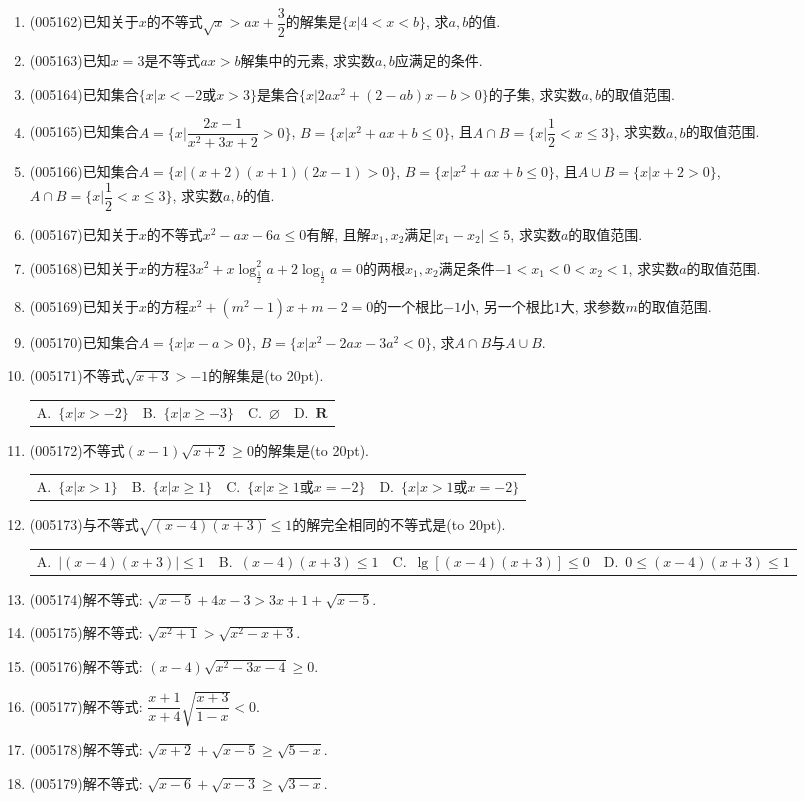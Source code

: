 \documentclass[10pt,a4paper]{article}
\newcommand{\bracket}[1]{(\hbox to #1pt{})}
\newcommand{\fourch}[4]{\par\begin{tabular}{p{.23\textwidth}p{.23\textwidth}p{.23\textwidth}p{.23\textwidth}}
A.~#1 &B.~#2& C.~#3& D.~#4
\end{tabular}}
\begin{document}
\begin{enumerate}[1.]
\item {\tiny (005162)}已知关于$x$的不等式$\sqrt x>ax+\dfrac 32$的解集是$\{x|4<x<b\}$, 求$a,b$的值.
\item {\tiny (005163)}已知$x=3$是不等式$ax>b$解集中的元素, 求实数$a,b$应满足的条件.
\item {\tiny (005164)}已知集合$\{x|x<-2\text{或}x>3\}$是集合$\{x|2ax^2+(2-ab)x-b>0\}$的子集, 求实数$a,b$的取值范围.
\item {\tiny (005165)}已知集合$A=\{x|\dfrac{2x-1}{x^2+3x+2}>0\}$, $B=\{x|x^2+ax+b\le 0\}$, 且$A\cap B=\{x|\dfrac 12<x\le 3\}$, 求实数$a,b$的取值范围.
\item {\tiny (005166)}已知集合$A=\{x|(x+2)(x+1)(2x-1)>0\}$, $B=\{x|x^2+ax+b\le 0\}$, 且$A\cup B=\{x|x+2 >0\}$, $A\cap B=\{x|\dfrac 12<x\le 3\}$, 求实数$a,b$的值.
\item {\tiny (005167)}已知关于$x$的不等式$x^2-ax-6a\le 0$有解, 且解$x_1,x_2$满足$|x_1-x_2|\le 5$, 求实数$a$的取值范围.
\item {\tiny (005168)}已知关于$x$的方程$3x^2+x\log_{\frac 12}^2a+2\log_{\frac 12}a=0$的两根$x_1,x_2$满足条件$-1<x_1<0<x_2<1$, 求实数$a$的取值范围.
\item {\tiny (005169)}已知关于$x$的方程$x^2+(m^2-1)x+m-2=0$的一个根比$-1$小, 另一个根比$1$大, 求参数$m$的取值范围.
\item {\tiny (005170)}已知集合$A=\{x|x-a>0\}$, $B=\{x|x^2-2ax-3a^2<0\}$, 求$A\cap B$与$A\cup B$.
\item {\tiny (005171)}不等式$\sqrt{x+3}>-1$的解集是\bracket{20}.
\fourch{$\{x|x>-2\}$}{$\{x|x\ge -3\}$}{$\varnothing$}{$\mathbf{R}$}
\item {\tiny (005172)}不等式$(x-1)\sqrt{x+2}\ge 0$的解集是\bracket{20}.
\fourch{$\{x|x>1\}$}{$\{x|x\ge 1\}$}{$\{x|x\ge 1\text{或}x=-2\}$}{$\{x|x>1\text{或}x=-2\}$}
\item {\tiny (005173)}与不等式$\sqrt{(x-4)(x+3)}\le 1$的解完全相同的不等式是\bracket{20}.
\fourch{$|(x-4)(x+3)|\le 1$}{$(x-4)(x+3)\le 1$}{$\lg [ (x-4)(x+3) ]\le 0$}{$0\le (x-4)(x+3)\le 1$}
\item {\tiny (005174)}解不等式: $\sqrt{x-5}+4x-3>3x+1+\sqrt{x-5}$.
\item {\tiny (005175)}解不等式: $\sqrt{x^2+1}>\sqrt{x^2-x+3}$.
\item {\tiny (005176)}解不等式: $(x-4)\sqrt{x^2-3x-4}\ge 0$.
\item {\tiny (005177)}解不等式: $\dfrac{x+1}{x+4}\sqrt{\dfrac{x+3}{1-x}}<0$.
\item {\tiny (005178)}解不等式: $\sqrt{x+2}+\sqrt{x-5}\ge \sqrt{5-x}$.
\item {\tiny (005179)}解不等式: $\sqrt{x-6}+\sqrt{x-3}\ge \sqrt{3-x}$.

\end{enumerate}
\end{document}
